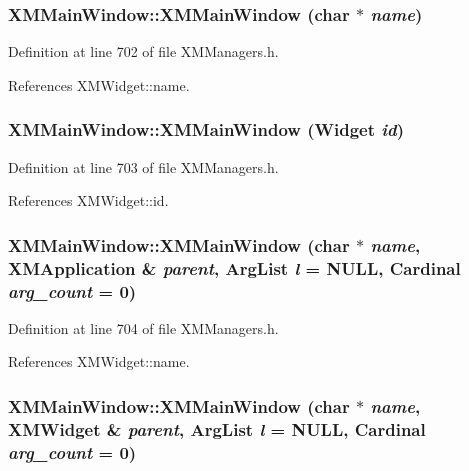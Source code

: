\subsubsection{\setlength{\rightskip}{0pt plus 5cm}XMMain\-Window::XMMain\-Window (char $\ast$ {\em name})\hspace{0.3cm}{\tt  [inline]}}\label{classXMMainWindow_a0}




Definition at line 702 of file XMManagers.h.

References XMWidget::name.
\subsubsection{\setlength{\rightskip}{0pt plus 5cm}XMMain\-Window::XMMain\-Window (Widget {\em id})\hspace{0.3cm}{\tt  [inline]}}\label{classXMMainWindow_a1}




Definition at line 703 of file XMManagers.h.

References XMWidget::id.
\subsubsection{\setlength{\rightskip}{0pt plus 5cm}XMMain\-Window::XMMain\-Window (char $\ast$ {\em name}, {\bf XMApplication} \& {\em parent}, Arg\-List {\em l} = NULL, Cardinal {\em arg\_\-count} = 0)\hspace{0.3cm}{\tt  [inline]}}\label{classXMMainWindow_a2}




Definition at line 704 of file XMManagers.h.

References XMWidget::name.
\subsubsection{\setlength{\rightskip}{0pt plus 5cm}XMMain\-Window::XMMain\-Window (char $\ast$ {\em name}, {\bf XMWidget} \& {\em parent}, Arg\-List {\em l} = NULL, Cardinal {\em arg\_\-count} = 0)\hspace{0.3cm}{\tt  [inline]}}\label{classXMMainWindow_a3}




